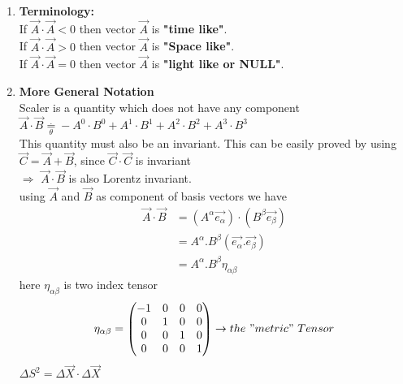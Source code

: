 \documentclass[11pt,a4paper]{article}
\begin{document}
\begin{enumerate}
\begin{enumerate}
\begin{enumerate}
			            \item \textbf{Terminology:}\\
			                  If $\vec{A}\cdot\vec{A} < 0$ then vector $\vec{A}$ is \textbf{"time like"}.\\
			                  If $\vec{A}\cdot\vec{A} > 0$ then vector $\vec{A}$ is \textbf{"Space like"}.\\
			                  If $\vec{A}\cdot\vec{A} = 0$ then vector $\vec{A}$ is \textbf{"light like or NULL"}.\\
			            \item \textbf{More General Notation}\\
			                  Scaler is a quantity which does not have any component\\
			                  $\vec{A}\cdot\vec{B} \mathop = \limits^{.}_{\theta} - A^0\cdot B^0 + A^1\cdot B^1 + A^2\cdot B^2 + A^3\cdot B^3$\\
			                  This quantity must also be an invariant. This can be easily proved by using $\vec{C}=\vec{A}+\vec{B}$, since $\vec{C}\cdot\vec{C}$ is invariant\\
			                  $\Rightarrow$ $ \vec{A}\cdot\vec{B}$ is also Lorentz invariant.\\
			                  using $\vec{A}$ and $\vec{B}$ as component of basis vectors we have
			                  \begin{align*}
				                  \vec{A}\cdot\vec{B} & = (A^{\alpha}\vec{e_{\alpha}})\cdot(B^{\beta}\vec{e_{\beta}}) \\
				                                      & = A^{\alpha}.B^{\beta} (\vec{e_{\alpha}}.\vec{e_{\beta}})     \\
				                                      & = A^{\alpha}.B^{\beta} {\displaystyle{\eta_{\alpha\beta}}}
			                  \end{align*}
			                  here ${\displaystyle{\eta_{\alpha\beta}}}$ is two index tensor
			                  \[ {\displaystyle{\eta_{\alpha\beta}}} = \begin{pmatrix}
					                  -1 & 0 & 0 & 0 \\
					                  0  & 1 & 0 & 0 \\
					                  0  & 0 & 1 & 0 \\
					                  0  & 0 & 0 & 1 \\\end{pmatrix} \rightarrow the\ "metric"\ Tensor \]
			                  $\Delta{S^2} = \Delta \vec{X} \cdot \Delta\vec{X}$\\

\end{enumerate}
\end{enumerate}
\end{enumerate}
\end{document}
